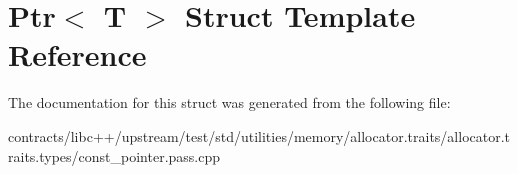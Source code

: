 \hypertarget{struct_ptr}{}\section{Ptr$<$ T $>$ Struct Template Reference}
\label{struct_ptr}


The documentation for this struct was generated from the following file\+:\begin{DoxyCompactItemize}
\item 
contracts/libc++/upstream/test/std/utilities/memory/allocator.\+traits/allocator.\+traits.\+types/const\+\_\+pointer.\+pass.\+cpp\end{DoxyCompactItemize}
